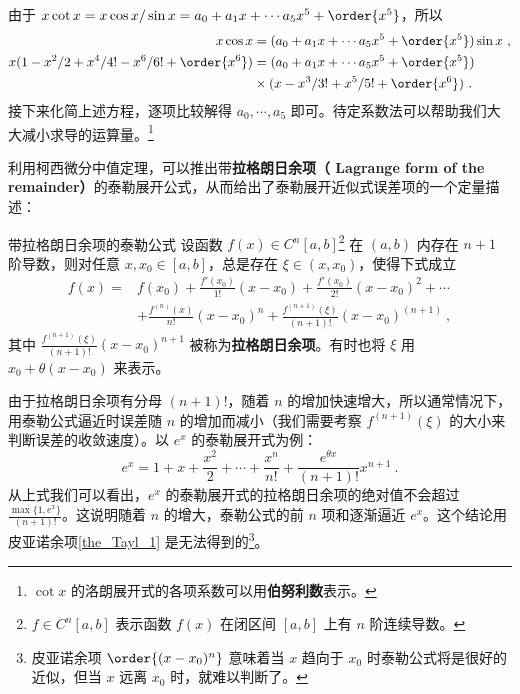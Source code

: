由于 $x\cot x=x\cos x/\sin x=a_0+a_1 x+\cdots a_5 x^5+\order{x^5}$，所以
\begin{equation}
\begin{aligned}
x\cos x&=(a_0+a_1 x+\cdots a_5 x^5+\order{x^5})\sin x~,\\
x(1-x^2/2+x^4/4!-x^6/6!+\order{x^6})&=(a_0+a_1 x+\cdots a_5 x^5+\order{x^5})\\
&\times (x-x^3/3!+x^5/5!+\order{x^6})~.
\end{aligned}
\end{equation}
接下来化简上述方程，逐项比较解得 $a_0,\cdots,a_5$ 即可。待定系数法可以帮助我们大大减小求导的运算量。\footnote{$\cot x$ 的洛朗展开式的各项系数可以用\textbf{伯努利数}表示。}

利用柯西微分中值定理，可以推出带\textbf{拉格朗日余项（ Lagrange form of the remainder）}的泰勒展开公式，从而给出了泰勒展开近似式误差项的一个定量描述：
\begin{theorem}{带拉格朗日余项的泰勒公式}
设函数 $f(x)\in C^n[a,b]$\footnote{$f\in C^n[a,b]$ 表示函数 $f(x)$ 在闭区间 $[a,b]$ 上有 $n$ 阶连续导数。} 在 $(a,b)$ 内存在 $n+1$ 阶导数，则对任意 $x,x_0\in [a,b]$，总是存在 $\xi\in (x,x_0)$，使得下式成立
\begin{equation}\label{eq_Tayl_3}
\begin{aligned}
f(x)=&f(x_0)+\frac{f'(x_0)}{1!}(x-x_0)+\frac{f'(x_0)}{2!}(x-x_0)^2+\cdots\\
&+\frac{f^{(n)}(x)}{n!}(x-x_0)^n+\frac{f^{(n+1)}(\xi)}{(n+1)!}(x-x_0)^{(n+1)}~,
\end{aligned}
\end{equation}
其中 $\frac{f^{(n+1)}(\xi)}{(n+1)!}(x-x_0)^{n+1}$ 被称为\textbf{拉格朗日余项}。有时也将 $\xi$ 用 $x_0+\theta(x-x_0)$ 来表示。
\end{theorem}

由于拉格朗日余项有分母 $(n+1)!$，随着 $n$ 的增加快速增大，所以通常情况下，用泰勒公式逼近时误差随 $n$ 的增加而减小（我们需要考察 $f^{(n+1)}(\xi)$ 的大小来判断误差的收敛速度）。以 $e^x$ 的泰勒展开式为例：
\begin{equation}
e^x=1+x+\frac{x^2}{2}+\cdots+\frac{x^n}{n!}+\frac{e^{\theta x}}{(n+1)!}x^{n+1}~.
\end{equation}
从上式我们可以看出，$e^x$ 的泰勒展开式的拉格朗日余项的绝对值不会超过 $\frac{\max\{1,e^x\}}{(n+1)!}$。这说明随着 $n$ 的增大，泰勒公式的前 $n$ 项和逐渐逼近 $e^x$。这个结论用皮亚诺余项\autoref{the_Tayl_1} 是无法得到的\footnote{皮亚诺余项 $\order{(x-x_0)^n}$ 意味着当 $x$ 趋向于 $x_0$ 时泰勒公式将是很好的近似，但当 $x$ 远离 $x_0$ 时，就难以判断了。}。

